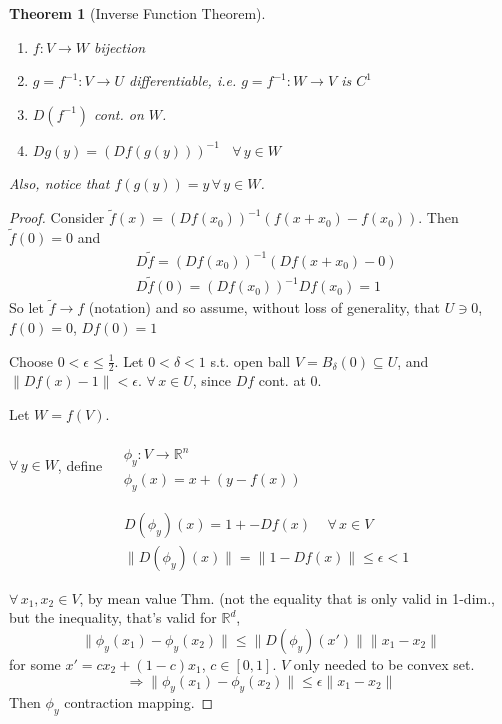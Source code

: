 \documentclass[10pt]{amsart}
\newtheorem{theorem}{Theorem}
\begin{document}
\begin{multicols*}{2}
\begin{theorem}[Inverse Function Theorem]
\begin{enumerate}
\item[(i)] $f: V\to W$ bijection
\item[(ii)] $g = f^{-1}:V \to U$ differentiable, i.e. $g = f^{-1}:W\to V$ is $C^1$
\item[(iii)] $D(f^{-1}) $ cont. on $W$.  
\item[(iv)] $Dg(y) = (Df(g(y)))^{-1}$ \, $\forall \, y \in W$
\end{enumerate}
Also, notice that $f(g(y)) = y \, \forall \, y \in W$.  
\end{theorem}

\begin{proof}

Consider $\widetilde{f}(x) = (Df(x_0))^{-1}(f(x+x_0) - f(x_0))$.  Then \\
\phantom{Consider} $\widetilde{f}(0) = 0$ and 
\[
\begin{aligned}
  &  D\widetilde{f}= (Df(x_0))^{-1}(Df(x+x_0) -0)  \\
  & D\widetilde{f}(0) = (Df(x_0))^{-1}Df(x_0)=1
\end{aligned}
\]  
So let $\widetilde{f}\to f$ (notation) and so assume, without loss of generality, that $U\ni 0$, $f(0)=0$, $Df(0)=1$

Choose $0 < \epsilon \leq \frac{1}{2}$.  Let $0< \delta <1$ s.t. open ball $V = B_{\delta}(0) \subseteq U$, and $\| Df(x)-1\| < \epsilon$.  $\forall \, x \in U$, since $Df$ cont. at $0$.  

Let $W=f(V)$.  

$\forall \, y \in W$, define $\begin{aligned} & \quad \\
  & \phi_y : V \to \mathbb{R}^n \\
  & \phi_y(x) = x + (y-f(x))\end{aligned}$

\[
\begin{aligned}
  & D(\phi_y)(x) = 1 + - Df(x) \quad \, \forall \, x \in V \\ 
  & \| D(\phi_y)(x) \| = \| 1 - Df(x) \| \leq \epsilon <1
\end{aligned}
\]

$\forall \, x_1 ,x_2 \in V$, by mean value Thm. (not the equality that is only valid in 1-dim., but the inequality, that's valid for $\mathbb{R}^d$, 
\[
\| \phi_y(x_1) - \phi_y(x_2) \| \leq \| D(\phi_y)(x') \| \| x_1 - x_2 \| 
\]
for some $x' = cx_2 + (1-c)x_1$, $c\in [0,1]$.  $V$ only needed to be convex set.  
\[
\Longrightarrow \| \phi_y(x_1) - \phi_y(x_2) \| \leq \epsilon \| x_1 - x_2 \|
\]
Then $\phi_y$ contraction mapping.  


\end{proof}
\end{multicols*}
\end{document}
